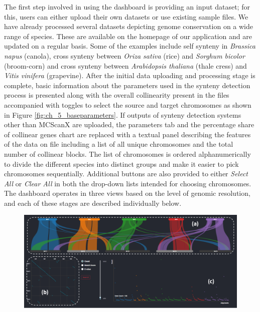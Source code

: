 The first step involved in using the dashboard is providing an input dataset; for this, users can either upload their own datasets or use existing sample files. We have already processed several datasets depicting genome conservation on a wide range of species. These are available on the homepage of our application and are updated on a regular basis. Some of the examples include self synteny in \textit{Brassica napus} (canola), cross synteny between \textit{Oriza sativa} (rice) and \textit{Sorghum bicolor} (broom-corn) and cross synteny between \textit{Arabidopsis thaliana} (thale cress) and \textit{Vitis vinifera} (grapevine). After the initial data uploading and processing stage is complete, basic information about the parameters used in the synteny detection process is presented along with the overall collinearity present in the files accompanied with toggles to select the source and target chromosomes as shown in Figure \ref{fig:ch_5_baseparameters}. If outputs of synteny detection systems other than MCScanX are uploaded, the parameters tab and the percentage share of collinear genes chart are replaced with a textual panel describing the features of the data on file including a list of all unique chromosomes and the total number of collinear blocks. The list of chromosomes is ordered alphanumerically to divide the different species into distinct groups and make it easier to pick chromosomes sequentially. Additional buttons are also provided to either \textit{Select All} or \textit{Clear All} in both the drop-down lists intended for choosing chromosomes. The dashboard operates in three views based on the level of genomic resolution, and each of these stages are described individually below.

\begin{figure}
  \centering
  \includegraphics[width=1\linewidth]{images/ch_1_dashboard.PNG}
  \label{fig:ch_4_dashboard}
\end{figure} 

